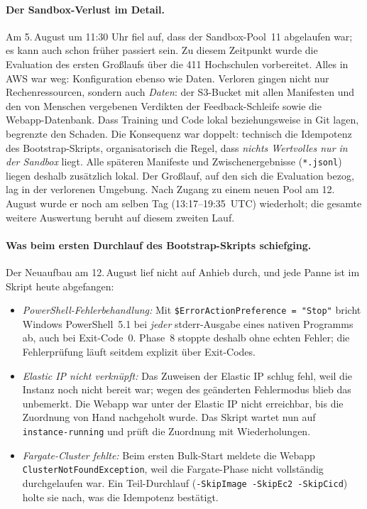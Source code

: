 \paragraph{Der Sandbox-Verlust im Detail.} Am 5.\,August um 11:30 Uhr fiel auf, dass der Sandbox-Pool~11 abgelaufen war; es kann auch schon früher passiert sein. Zu diesem Zeitpunkt wurde die Evaluation des ersten Großlaufs über die 411 Hochschulen vorbereitet. Alles in AWS war weg: Konfiguration ebenso wie Daten. Verloren gingen nicht nur Rechenressourcen, sondern auch \emph{Daten}: der S3-Bucket mit allen Manifesten und den von Menschen vergebenen Verdikten der Feedback-Schleife sowie die Webapp-Datenbank. Dass Training und Code lokal beziehungsweise in Git lagen, begrenzte den Schaden. Die Konsequenz war doppelt: technisch die Idempotenz des Bootstrap-Skripts, organisatorisch die Regel, dass \emph{nichts Wertvolles nur in der Sandbox} liegt. Alle späteren Manifeste und Zwischenergebnisse (\texttt{*.jsonl}) liegen deshalb zusätzlich lokal. Der Großlauf, auf den sich die Evaluation bezog, lag in der verlorenen Umgebung. Nach Zugang zu einem neuen Pool am 12.\,August wurde er noch am selben Tag (13:17--19:35~UTC) wiederholt; die gesamte weitere Auswertung beruht auf diesem zweiten Lauf.

\paragraph{Was beim ersten Durchlauf des Bootstrap-Skripts schiefging.} Der Neuaufbau am 12.\,August lief nicht auf Anhieb durch, und jede Panne ist im Skript heute abgefangen:
\begin{itemize}
  \item \emph{PowerShell-Fehlerbehandlung:} Mit \texttt{\$ErrorActionPreference = "Stop"} bricht Windows PowerShell~5.1 bei \emph{jeder} stderr-Ausgabe eines nativen Programms ab, auch bei Exit-Code~0. Phase~8 stoppte deshalb ohne echten Fehler; die Fehlerprüfung läuft seitdem explizit über Exit-Codes.
  \item \emph{Elastic IP nicht verknüpft:} Das Zuweisen der Elastic IP schlug fehl, weil die Instanz noch nicht bereit war; wegen des geänderten Fehlermodus blieb das unbemerkt. Die Webapp war unter der Elastic IP nicht erreichbar, bis die Zuordnung von Hand nachgeholt wurde. Das Skript wartet nun auf \texttt{instance-running} und prüft die Zuordnung mit Wiederholungen.
  \item \emph{Fargate-Cluster fehlte:} Beim ersten Bulk-Start meldete die Webapp \texttt{ClusterNotFoundException}, weil die Fargate-Phase nicht vollständig durchgelaufen war. Ein Teil-Durchlauf (\texttt{-SkipImage -SkipEc2 -SkipCicd}) holte sie nach, was die Idempotenz bestätigt.
\end{itemize}

